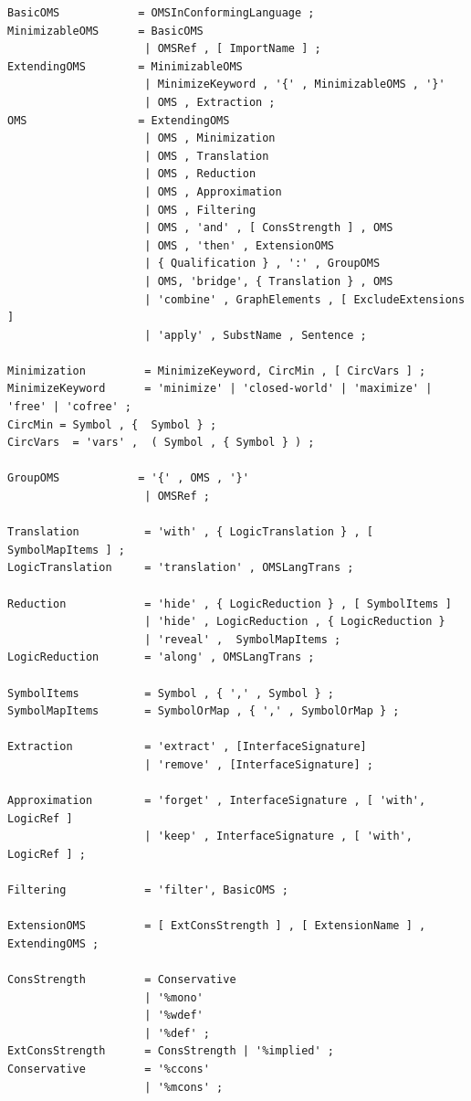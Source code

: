 \documentclass[10pt,%
\ifpretendfinal
final%
\else
draft%
\fi,
]{scrreprt}
\begin{document}
\begin{lstlisting}[language=ebnf,escapeinside={<>},mathescape]
BasicOMS            = OMSInConformingLanguage ;
MinimizableOMS      = BasicOMS
                     | OMSRef , [ ImportName ] ; 
ExtendingOMS        = MinimizableOMS
                     | MinimizeKeyword , '{' , MinimizableOMS , '}' 
                     | OMS , Extraction ;
OMS                 = ExtendingOMS
                     | OMS , Minimization 
                     | OMS , Translation
                     | OMS , Reduction
                     | OMS , Approximation
                     | OMS , Filtering
                     | OMS , 'and' , [ ConsStrength ] , OMS 
                     | OMS , 'then' , ExtensionOMS
                     | { Qualification } , ':' , GroupOMS
                     | OMS, 'bridge', { Translation } , OMS 
                     | 'combine' , GraphElements , [ ExcludeExtensions ]  
                     | 'apply' , SubstName , Sentence ;

Minimization         = MinimizeKeyword, CircMin , [ CircVars ] ;
MinimizeKeyword      = 'minimize' | 'closed-world' | 'maximize' | 'free' | 'cofree' ;
CircMin = Symbol , {  Symbol } ;
CircVars  = 'vars' ,  ( Symbol , { Symbol } ) ;

GroupOMS            = '{' , OMS , '}'
                     | OMSRef ;

Translation          = 'with' , { LogicTranslation } , [ SymbolMapItems ] ;
LogicTranslation     = 'translation' , OMSLangTrans ;
                      
Reduction            = 'hide' , { LogicReduction } , [ SymbolItems ]
                     | 'hide' , LogicReduction , { LogicReduction } 
                     | 'reveal' ,  SymbolMapItems ;
LogicReduction       = 'along' , OMSLangTrans ;

SymbolItems          = Symbol , { ',' , Symbol } ;
SymbolMapItems       = SymbolOrMap , { ',' , SymbolOrMap } ;

Extraction           = 'extract' , [InterfaceSignature]
                     | 'remove' , [InterfaceSignature] ;

Approximation        = 'forget' , InterfaceSignature , [ 'with', LogicRef ] 
                     | 'keep' , InterfaceSignature , [ 'with', LogicRef ] ;

Filtering            = 'filter', BasicOMS ;

ExtensionOMS         = [ ExtConsStrength ] , [ ExtensionName ] , ExtendingOMS ;

ConsStrength         = Conservative
                     | '%mono'
                     | '%wdef'
                     | '%def' ;
ExtConsStrength      = ConsStrength | '%implied' ;
Conservative         = '%ccons'
                     | '%mcons' ; 


\end{lstlisting}
\end{document}
